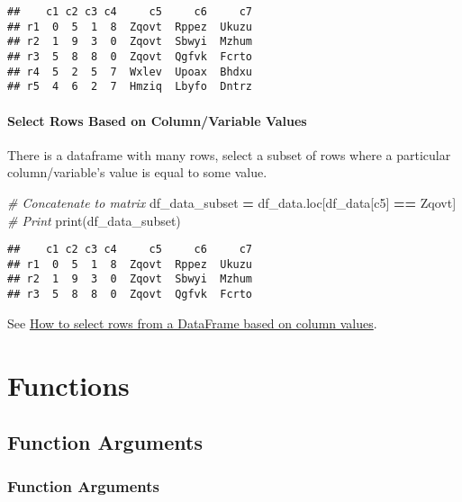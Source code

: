 \documentclass[
]{book}
\newenvironment{Shaded}{\begin{snugshade}}{\end{snugshade}}
\newcommand{\BuiltInTok}[1]{#1}
\newcommand{\CommentTok}[1]{\textcolor[rgb]{0.56,0.35,0.01}{\textit{#1}}}
\newcommand{\NormalTok}[1]{#1}
\newcommand{\OperatorTok}[1]{\textcolor[rgb]{0.81,0.36,0.00}{\textbf{#1}}}
\newcommand{\StringTok}[1]{\textcolor[rgb]{0.31,0.60,0.02}{#1}}
\begin{document}
\begin{verbatim}
##    c1 c2 c3 c4     c5     c6     c7
## r1  0  5  1  8  Zqovt  Rppez  Ukuzu
## r2  1  9  3  0  Zqovt  Sbwyi  Mzhum
## r3  5  8  8  0  Zqovt  Qgfvk  Fcrto
## r4  5  2  5  7  Wxlev  Upoax  Bhdxu
## r5  4  6  2  7  Hmziq  Lbyfo  Dntrz
\end{verbatim}

\hypertarget{select-rows-based-on-columnvariable-values}{%
\subsubsection{Select Rows Based on Column/Variable Values}\label{select-rows-based-on-columnvariable-values}}

There is a dataframe with many rows, select a subset of rows where a particular column/variable's value is equal to some value.

\begin{Shaded}
\begin{Highlighting}[]
\CommentTok{\# Concatenate to matrix}
\NormalTok{df\_data\_subset }\OperatorTok{=}\NormalTok{ df\_data.loc[df\_data[}\StringTok{\textquotesingle{}c5\textquotesingle{}}\NormalTok{] }\OperatorTok{==} \StringTok{\textquotesingle{}Zqovt\textquotesingle{}}\NormalTok{]}
\CommentTok{\# Print}
\BuiltInTok{print}\NormalTok{(df\_data\_subset)}
\end{Highlighting}
\end{Shaded}

\begin{verbatim}
##    c1 c2 c3 c4     c5     c6     c7
## r1  0  5  1  8  Zqovt  Rppez  Ukuzu
## r2  1  9  3  0  Zqovt  Sbwyi  Mzhum
## r3  5  8  8  0  Zqovt  Qgfvk  Fcrto
\end{verbatim}

See \href{https://stackoverflow.com/a/17071908/8280804}{How to select rows from a DataFrame based on column values}.

\hypertarget{functions}{%
\chapter{Functions}\label{functions}}

\hypertarget{function-arguments}{%
\section{Function Arguments}\label{function-arguments}}

\hypertarget{function-arguments-1}{%
\subsection{Function Arguments}\label{function-arguments-1}}
\end{document}
